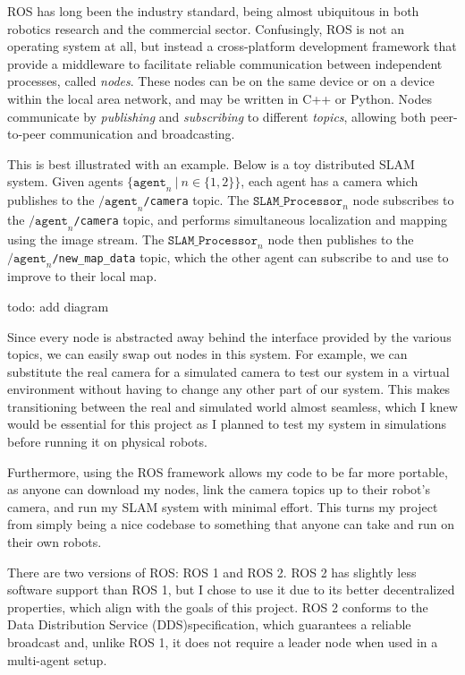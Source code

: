 ROS has long been the industry standard, being almost ubiquitous in both robotics research and the commercial sector. Confusingly, ROS is not an operating system at all, but instead a cross-platform development framework that provide a middleware to facilitate reliable communication between independent processes, called \textit{nodes}. These nodes can be on the same device or on a device within the local area network, and may be written in C++ or Python. Nodes communicate by \textit{publishing} and \textit{subscribing} to different \textit{topics}, allowing both peer-to-peer communication and broadcasting.

This is best illustrated with an example. Below is a toy distributed SLAM system. Given agents $\{ \texttt{agent}_n \ | \ n \in \{1, 2\} \}$, each agent has a camera which publishes to the $\texttt{/agent}_n$\verb|/camera| topic. The $\texttt{SLAM\_Processor}_n$ node subscribes to the $\texttt{/agent}_n$\verb|/camera| topic, and performs simultaneous localization and mapping using the image stream. The $\texttt{SLAM\_Processor}_n$ node then publishes to the $\texttt{/agent}_n$\verb|/new_map_data| topic, which the other agent can subscribe to and use to improve to their local map.

todo: add diagram

Since every node is abstracted away behind the interface provided by the various topics, we can easily swap out nodes in this system. For example, we can substitute the real camera for a simulated camera to test our system in a virtual environment without having to change any other part of our system. This makes transitioning between the real and simulated world almost seamless, which I knew would be essential for this project as I planned to test my system in simulations before running it on physical robots.

Furthermore, using the ROS framework allows my code to be far more portable, as anyone can download my nodes, link the camera topics up to their robot's camera, and run my SLAM system with minimal effort. This turns my project from simply being a nice codebase to something that anyone can take and run on their own robots.

There are two versions of ROS: ROS 1 and ROS 2. ROS 2 has slightly less software support than ROS 1, but I chose to use it due to its better decentralized properties, which align with the goals of this project. ROS 2 conforms to the Data Distribution Service (DDS)\footnotemark[1] specification, which guarantees a reliable broadcast and, unlike ROS 1, it does not require a leader node when used in a multi-agent setup.

